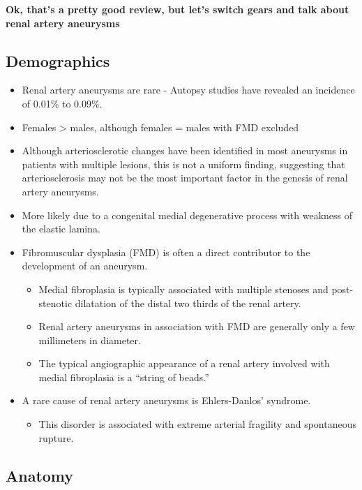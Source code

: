 \documentclass[
]{book}
\providecommand{\tightlist}{%
  \setlength{\itemsep}{0pt}\setlength{\parskip}{0pt}}
\begin{document}
\textbf{Ok, that's a pretty good review, but let's switch gears and talk about
renal artery aneurysms}

\hypertarget{demographics-3}{%
\subsection{Demographics}\label{demographics-3}}

\begin{itemize}
\item
  Renal artery aneurysms are rare - Autopsy studies have revealed an
  incidence of 0.01\% to 0.09\%.
\item
  Females \textgreater{} males, although females = males with FMD excluded
\item
  Although arteriosclerotic changes have been identified in most
  aneurysms in patients with multiple lesions, this is not a uniform
  finding, suggesting that arteriosclerosis may not be the most
  important factor in the genesis of renal artery aneurysms.
\item
  More likely due to a congenital medial degenerative process with
  weakness of the elastic lamina.
\item
  Fibromuscular dysplasia (FMD) is often a direct contributor to the
  development of an aneurysm.

  \begin{itemize}
  \item
    Medial fibroplasia is typically associated with multiple
    stenoses and post-stenotic dilatation of the distal two thirds
    of the renal artery.
  \item
    Renal artery aneurysms in association with FMD are generally
    only a few millimeters in diameter.
  \item
    The typical angiographic appearance of a renal artery involved
    with medial fibroplasia is a ``string of beads.''
  \end{itemize}
\item
  A rare cause of renal artery aneurysms is Ehlers-Danlos' syndrome.

  \begin{itemize}
  \tightlist
  \item
    This disorder is associated with extreme arterial fragility and
    spontaneous rupture.
  \end{itemize}
\end{itemize}

\hypertarget{anatomy-2}{%
\subsection{Anatomy}\label{anatomy-2}}
\end{document}

